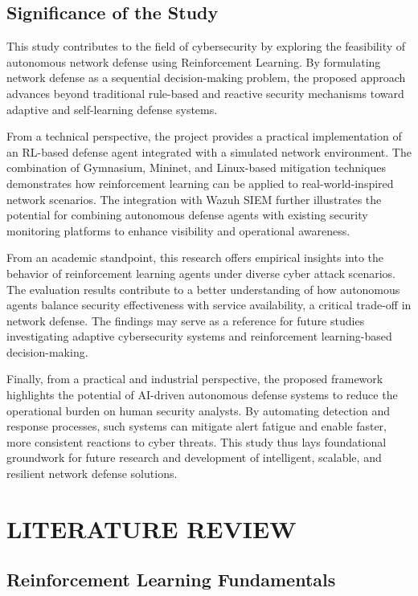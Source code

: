 \documentclass[12pt,a4paper]{report}
\begin{document}
\section{Significance of the Study}

This study contributes to the field of cybersecurity by exploring the feasibility of autonomous network defense using Reinforcement Learning.
By formulating network defense as a sequential decision-making problem, the proposed approach advances beyond traditional rule-based and reactive security mechanisms toward adaptive and self-learning defense systems.

From a technical perspective, the project provides a practical implementation of an RL-based defense agent integrated with a simulated network environment.
The combination of Gymnasium, Mininet, and Linux-based mitigation techniques demonstrates how reinforcement learning can be applied to real-world-inspired network scenarios.
The integration with Wazuh SIEM further illustrates the potential for combining autonomous defense agents with existing security monitoring platforms to enhance visibility and operational awareness.

From an academic standpoint, this research offers empirical insights into the behavior of reinforcement learning agents under diverse cyber attack scenarios.
The evaluation results contribute to a better understanding of how autonomous agents balance security effectiveness with service availability, a critical trade-off in network defense.
The findings may serve as a reference for future studies investigating adaptive cybersecurity systems and reinforcement learning-based decision-making.

Finally, from a practical and industrial perspective, the proposed framework highlights the potential of AI-driven autonomous defense systems to reduce the operational burden on human security analysts.
By automating detection and response processes, such systems can mitigate alert fatigue and enable faster, more consistent reactions to cyber threats.
This study thus lays foundational groundwork for future research and development of intelligent, scalable, and resilient network defense solutions.

\chapter{LITERATURE REVIEW}
\section{Reinforcement Learning Fundamentals}
\end{document}
